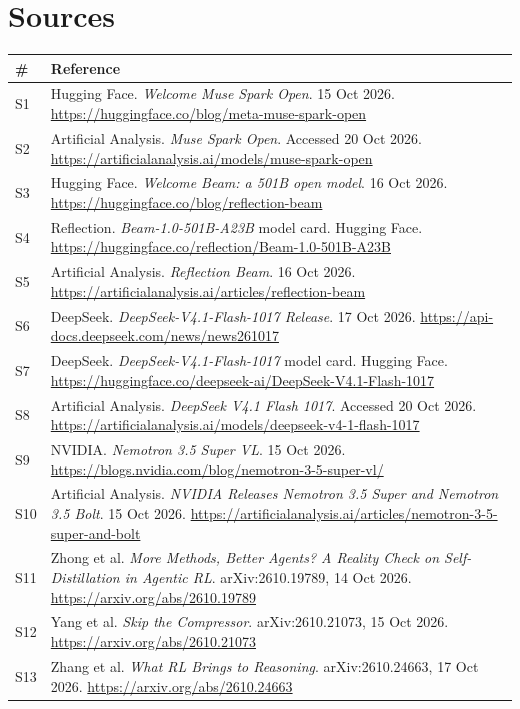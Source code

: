 \documentclass[11pt,a4paper]{article}
\begin{document}
\section{Sources}
{\footnotesize
\begin{tabularx}{\textwidth}{@{}l X@{}}
\toprule
\textbf{\#} & \textbf{Reference} \\
\midrule
S1  & Hugging Face. \emph{Welcome Muse Spark Open}. 15 Oct 2026. \url{https://huggingface.co/blog/meta-muse-spark-open} \\
S2  & Artificial Analysis. \emph{Muse Spark Open}. Accessed 20 Oct 2026. \url{https://artificialanalysis.ai/models/muse-spark-open} \\
S3  & Hugging Face. \emph{Welcome Beam: a 501B open model}. 16 Oct 2026. \url{https://huggingface.co/blog/reflection-beam} \\
S4  & Reflection. \emph{Beam-1.0-501B-A23B} model card. Hugging Face. \url{https://huggingface.co/reflection/Beam-1.0-501B-A23B} \\
S5  & Artificial Analysis. \emph{Reflection Beam}. 16 Oct 2026. \url{https://artificialanalysis.ai/articles/reflection-beam} \\
S6  & DeepSeek. \emph{DeepSeek-V4.1-Flash-1017 Release}. 17 Oct 2026. \url{https://api-docs.deepseek.com/news/news261017} \\
S7  & DeepSeek. \emph{DeepSeek-V4.1-Flash-1017} model card. Hugging Face. \url{https://huggingface.co/deepseek-ai/DeepSeek-V4.1-Flash-1017} \\
S8  & Artificial Analysis. \emph{DeepSeek V4.1 Flash 1017}. Accessed 20 Oct 2026. \url{https://artificialanalysis.ai/models/deepseek-v4-1-flash-1017} \\
S9  & NVIDIA. \emph{Nemotron 3.5 Super VL}. 15 Oct 2026. \url{https://blogs.nvidia.com/blog/nemotron-3-5-super-vl/} \\
S10 & Artificial Analysis. \emph{NVIDIA Releases Nemotron 3.5 Super and Nemotron 3.5 Bolt}. 15 Oct 2026. \url{https://artificialanalysis.ai/articles/nemotron-3-5-super-and-bolt} \\
S11 & Zhong et al. \emph{More Methods, Better Agents? A Reality Check on Self-Distillation in Agentic RL}. arXiv:2610.19789, 14 Oct 2026. \url{https://arxiv.org/abs/2610.19789} \\
S12 & Yang et al. \emph{Skip the Compressor}. arXiv:2610.21073, 15 Oct 2026. \url{https://arxiv.org/abs/2610.21073} \\
S13 & Zhang et al. \emph{What RL Brings to Reasoning}. arXiv:2610.24663, 17 Oct 2026. \url{https://arxiv.org/abs/2610.24663} \\

\end{tabularx}}
\end{document}
